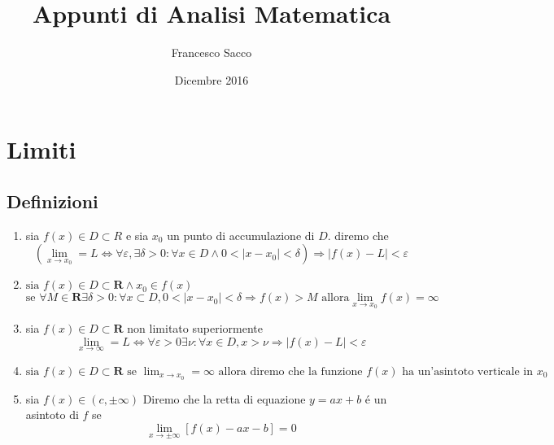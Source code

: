 \documentclass{exam}
\date{Dicembre 2016}
\title{Appunti di Analisi Matematica}
\author{Francesco Sacco}
\begin{document}
\section{Limiti}
  \subsection{Definizioni}
    \begin{enumerate}
      \item 
        sia $f(x) \in D\subset R$ e sia $x_{0}$ un punto di accumulazione di $D$. diremo che
        \begin{displaymath}
          (\lim_{x \to x_{0}}=L\Leftrightarrow \forall \varepsilon , \exists \delta > 0 :
          \forall x \in D \land 0<|x-x_{0}|< \delta) \Rightarrow |f(x)-L|<\varepsilon
        \end{displaymath}
      \item
        $\textrm{sia } f(x) \in D \subset \mathbf{R} \land x_{0}\in f(x) $
        \begin{displaymath}
          \textrm{se } \forall M \in \mathbf{R} \exists \delta >0: \forall x \subset D , 
          0<|x-x_{0}|<\delta \Rightarrow f(x)>M
          \textrm{ allora} \lim_{x \to x_{0}}f(x)=\infty
        \end{displaymath}
      \item 
        sia $f(x) \in D \subset \mathbf{R}$ non limitato superiormente
        \begin{displaymath}
          \lim_{x \to \infty}=L \Leftrightarrow 
          \forall \varepsilon>0 \exists \nu:\forall x\in D,
          x>\nu \Rightarrow |f(x)-L|<\varepsilon
        \end{displaymath}
      \item
        \(\displaystyle
          \textrm{sia } f(x) \in D\subset \mathbf{R}
          \textrm{ se }\lim_{x\to x_{0}}=\infty \textrm{ allora diremo che la funzione }f(x) 
          \textrm{ ha un'asintoto verticale in }x_{0}
        \)
      \item 
        sia $f(x)\in (c, \pm \infty)$ Diremo che la retta di equazione $y=ax+b$
        \'e un asintoto di $f$ se
          \begin{displaymath}
            \lim_{x\to \pm \infty}[f(x)-ax-b]=0
          \end{displaymath}
    \end{enumerate}
  
  
  
\end{document}
